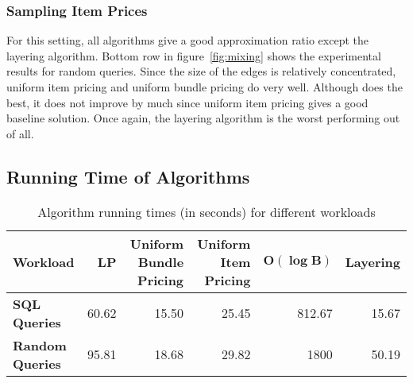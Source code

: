 \subsubsection{Sampling Item Prices} For this setting, all algorithms give a good approximation ratio except the layering algorithm. Bottom row in figure~\ref*{fig:mixing} shows the experimental results for random queries. Since the size of the edges is relatively concentrated, uniform item pricing and uniform bundle pricing do very well. Although \lpip does the best, it does not improve by much since uniform item pricing gives a good baseline solution.  Once again, the layering algorithm is the worst performing out of all.


\subsection{Running Time of Algorithms}

\begin{table*}[] \centering
	\begin{small}
		\begin{tabular}{@{}lrrrrr@{}}\toprule
			\textbf{Workload} & \textbf{LP} & \textbf{Uniform Bundle Pricing} & \textbf{Uniform Item Pricing} & $\mathbf{O(\log B)}$ & \textbf{Layering}  \\ \midrule
			
			\textbf{SQL Queries} &  60.62 & 15.50 & 25.45 & 812.67 & 15.67 \\ \hdashline
			\textbf{Random Queries} &  95.81 & 18.68 &  29.82 &1800 & 50.19 \\
			\bottomrule
		\end{tabular}
	\end{small}
	\caption{Algorithm running times (in seconds) for different workloads}
	\label{table:runtime}
\end{table*}

